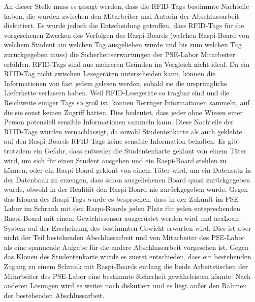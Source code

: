 An dieser Stelle muss es gesagt werden, dass die RFID-Tags bestimmte Nachteile haben, die wurden zwischen den Mitarbeiter und Autorin der Abschlussarbeit diskutiert. Es wurde jedoch die Entscheidung getroffen, dass RFID-Tags für die vorgesehenen Zwecken des Verfolgen des Raspi-Boards (welchen Raspi-Board von welchem Student am welchen Tag ausgeliehen wurde und bis zum welchen Tag zurückgegeben muss) die Sicherheitserwartungen der PSE-Labor Mitarbeiter erfühlen. RFID-Tags sind aus mehreren Gründen im Vergleich nicht ideal. Da ein RFID-Tag nicht zwischen Lesegeräten unterscheiden kann, können die Informationen von fast jedem gelesen werden, sobald sie die ursprüngliche Lieferkette verlassen haben. Weil RFID-Lesegeräte so tragbar sind und die Reichweite einiger Tags so groß ist, können Betrüger Informationen sammeln, auf die sie sonst keinen Zugriff hätten. Dies bedeutet, dass jeder ohne Wissen einer Person potenziell sensible Informationen sammeln kann. Diese Nachteile der RFID-Tags wurden vernachlässigt, da sowohl Studentenkarte als auch geklebte auf den Raspi-Boards RFID-Tags keine sensible Information behalten. Es gibt trotzdem ein Gefahr, dass entweder die Studentenkarte geklont von einem Täter wird, um sich für einen Student ausgeben und ein Raspi-Board stehlen zu können, oder ein Raspi-Board geklont von einem Täter wird, um ein Datensatz in der Datenbank zu erzeugen, dass schon ausgeliehenen Board quasi zurückgegeben wurde, obwohl in der Realität den Raspi-Board nie zurückgegeben wurde. Gegen das Klonen des Raspi-Tags wurde es besprochen, dass in der Zukunft im PSE-Labor im Schrank mit den Raspi-Boards jeden Platz für jeden entsprechenden Raspi-Board mit einem Gewichtssensor ausgerüstet werden wird und acaLoan-System auf der Erscheinung des bestimmten Gewicht erwarten wird. Dies ist aber nicht der Teil bestehenden Abschlussarbeit und von Mitarbeiter des PSE-Labor als eine spannende Aufgabe für die andere Abschlussarbeit vorgesehen ist. Gegen das Klonen des Studentenkarte wurde es zuerst entschieden, dass ein bestehenden Zugang zu einem Schrank mit Raspi-Boards entlang die beide Arbeitstischen der Mitarbeiter des PSE-Labor eine bestimmte Sicherheit gewährleisten könnte. Nach anderen Lösungen wird es weiter noch diskutiert und es liegt außer den Rahmen der bestehenden Abschlussarbeit. 
	
